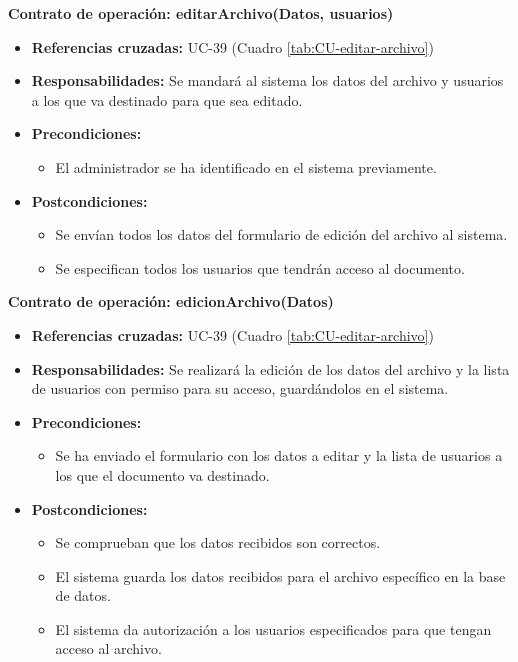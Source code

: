\textbf{Contrato de operación: editarArchivo(Datos, usuarios)}
\begin{itemize}
\item \textbf{Referencias cruzadas:} UC-39 (Cuadro \ref{tab:CU-editar-archivo})
\item \textbf{Responsabilidades:} Se mandará al sistema los datos del archivo y usuarios a los que va destinado para que sea editado.
\item \textbf{Precondiciones:} 
 \begin{itemize}
\item El administrador se ha identificado en el sistema previamente.
\end {itemize}
\item \textbf{Postcondiciones:} 
 \begin{itemize}
\item Se envían todos los datos del formulario de edición del archivo al sistema.
\item Se especifican todos los usuarios que tendrán acceso al documento.
\end {itemize}
\end {itemize}

\textbf{Contrato de operación: edicionArchivo(Datos)}
\begin{itemize}
\item \textbf{Referencias cruzadas:} UC-39 (Cuadro \ref{tab:CU-editar-archivo})
\item \textbf{Responsabilidades:} Se realizará la edición de los datos del archivo y la lista de usuarios con permiso para su acceso, guardándolos en el sistema.
\item \textbf{Precondiciones:} 
 \begin{itemize}
\item Se ha enviado el formulario con los datos a editar y la lista de usuarios a los que el documento va destinado.
\end {itemize}
\item \textbf{Postcondiciones:} 
 \begin{itemize}
 \item Se comprueban que los datos recibidos son correctos.
\item El sistema guarda los datos recibidos para el archivo específico en la base de datos.
\item El sistema da autorización a los usuarios especificados para que tengan acceso al archivo.
\end {itemize}
\end {itemize}

